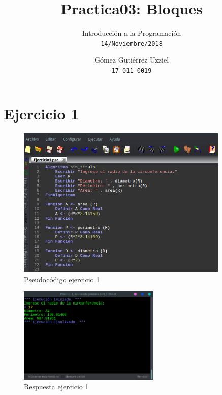 \documentclass[11pt, a4paper]{report}
\begin{document}
\title{Practica03: Bloques}
\author{
  Introducci\'on a la Programaci\'on\\
  \texttt{14/Noviembre/2018}
  \and
  G\'omez Guti\'errez Uzziel\\
  \texttt{17-011-0019}
}
\date{}
\maketitle

\section*{Ejercicio 1}

\begin{figure}[!ht]
\begin{center}
  \includegraphics[width=0.9\textwidth]{ejercicio1.png}
  \caption{Pseudoc\'odigo ejercicio 1}
\end{center}
\end{figure}

\begin{figure}[!ht]
\begin{center}
  \includegraphics[width=0.6\textwidth]{respuesta1.png}
  \caption{Respuesta ejercicio 1}
\end{center}
\end{figure}
 	
\end{document}
